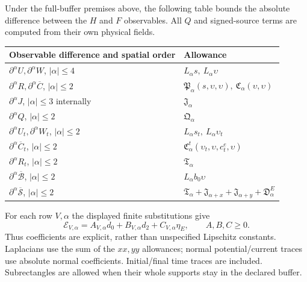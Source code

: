 \begin{theorem}\label{thm:compact-transfer}
Under the full-buffer premises above, the following table bounds the
absolute difference between the $H$ and $F$ observables. All $Q$ and
signed-source terms are computed from their own physical fields.
\begingroup\small
\begin{longtable}{@{}>{\raggedright\arraybackslash}p{}>{\raggedright\arraybackslash}p{}@{}}
\toprule Observable difference and spatial order & Allowance\\\midrule\endhead
$\partial^\alpha U,\partial^\alpha W$, $|\alpha|\le4$ &
$L_\alpha s,\ L_\alpha\upsilon$\\
$\partial^\alpha R,\partial^\alpha\overline C$, $|\alpha|\le2$ &
$\mathfrak P_\alpha(s,\upsilon,\upsilon),\ \mathfrak C_\alpha(\upsilon,\upsilon)$\\
$\partial^\alpha J$, $|\alpha|\le3$ internally & $\mathfrak J_\alpha$\\
$\partial^\alpha Q$, $|\alpha|\le2$ & $\mathfrak Q_\alpha$\\
$\partial^\alpha U_t,\partial^\alpha W_t$, $|\alpha|\le2$ &
$L_\alpha s_t,\ L_\alpha\upsilon_t$\\
$\partial^\alpha\overline C_t$, $|\alpha|\le2$ &
$\mathfrak C^t_\alpha(\upsilon_t,\upsilon,c_t^e,\upsilon)$\\
$\partial^\alpha R_t$, $|\alpha|\le2$ & $\mathfrak T_\alpha$\\
$\partial^\alpha\overline{\mathcal B}$, $|\alpha|\le2$ & $L_\alpha b_0\upsilon$\\
$\partial^\alpha\overline{\mathcal S}$, $|\alpha|\le2$ &
$\mathfrak T_\alpha+\mathfrak J_{\alpha+x}+\mathfrak J_{\alpha+y}+\mathfrak D^E_\alpha$\\
\bottomrule
\end{longtable}\endgroup
For each row $V,\alpha$ the displayed finite substitutions give
\begin{equation}
 \mathcal E_{V,\alpha}=A_{V,\alpha}d_0+B_{V,\alpha}d_2
                       +C_{V,\alpha}\eta_E,\qquad A,B,C\ge0.
 \label{eq:cj-linear-table}
\end{equation}
Thus coefficients are explicit, rather than unspecified Lipschitz
constants. Laplacians use the sum of the $xx,yy$ allowances; normal
potential/current traces use absolute normal coefficients. Initial/final
time traces are included. Subrectangles are allowed when their whole
supports stay in the declared buffer.
\end{theorem}
